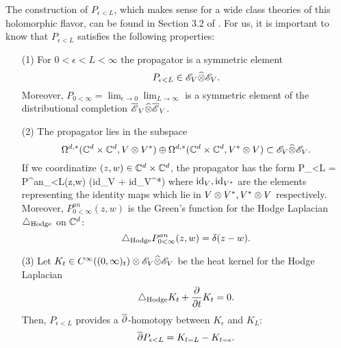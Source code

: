 \documentclass[10pt]{amsart}
\begin{document}
The construction of $P_{\epsilon<L}$, which makes sense for a wide class theories of this holomorphic flavor, can be found in Section 3.2 of \cite{BWhol}.
For us, it is important to know that $P_{\epsilon<L}$ satisfies the following properties:

\begin{enumerate}
\item[(1)] For $0 < \epsilon < L < \infty$ the propagator is a symmetric element
\[
P_{\epsilon < L} \in \mathscr E_V \widehat{\otimes} \mathscr E_V .
\]
Moreover, $P_{0 < \infty} = \lim_{\epsilon \to 0}\lim_{L \to \infty}$ is a symmetric element of the distributional completion $\overline{\mathscr E}_V \widehat{\otimes} \overline{\mathscr E}_V$. 

\item[(2)] 
The propagator lies in the subspace
\[
\Omega^{d,*}(\mathbb C^d \times \mathbb C^d, V \otimes V^*) \oplus \Omega^{d,*}(\mathbb C^d \times \mathbb C^d, V^* \otimes V) \subset \mathscr E_V \widehat{\otimes} \mathscr E_V .
\]
If we coordinatize $(z,w) \in \mathbb C^d \times \mathbb C^d$, the propagator has the form
\beqn
P_{\epsilon<L} = P^{an}_{\epsilon<L}(z,w) \tensor \left({\rm id}_{V} + {\rm id}_{V^*}\right)
\eeqn
where ${\rm id}_V, {\rm id}_{V^*}$ are the elements representing the identity maps which lie in $V \otimes V^*, V^* \otimes V$ respectively. 
Moreover, $P^{an}_{0 < \infty} (z,w)$ is the Green's function for the Hodge Laplacian $\triangle_{\rm Hodge}$ on $\mathbb C^d$:
\[
\triangle_{\rm Hodge} P^{an}_{0<\infty} (z,w) = \delta (z-w) .
\]

\item[(3)] Let $K_t \in C^\infty((0,\infty)_t) \otimes \mathscr E_V \widehat{\otimes} \mathscr E_V$ be the heat kernel for the Hodge Laplacian
\[
\triangle_{\rm Hodge} K_t + \frac{\partial}{\partial t} K_t = 0 .
\]
Then, $P_{\epsilon < L}$ provides a $\overline{\partial}$-homotopy between $K_\epsilon$ and $K_L$:
\[
\overline{\partial} P_{\epsilon < L} = K_{t=L} - K_{t=\epsilon} .
\]
\end{enumerate}

\end{document}
